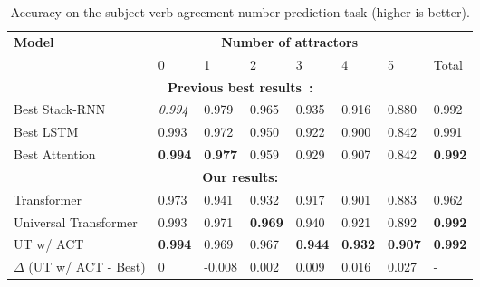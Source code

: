 \begin{table}
\centering
\begin{adjustbox}{max width=\textwidth}
\begin{tabular}{llllllll}
\toprule
\multirow{2}{*}{ \bf Model } & \multicolumn{6}{c}{ \bf Number of attractors } & \\ \cmidrule{2-7}
& 0 & 1 & 2 & 3 & 4 & 5 & Total \\ \midrule
\multicolumn{8}{c}{ \bf Previous best results~\citep{yogatama2018memory}: } \\ \midrule
Best Stack-RNN & \emph{0.994} & 0.979 & 0.965 & 0.935 & 0.916 & 0.880 & 0.992 \\
Best LSTM & 0.993 & 0.972 & 0.950 & 0.922 & 0.900 & 0.842 & 0.991 \\
Best Attention & \textbf{0.994} & \textbf{0.977} & 0.959 & 0.929 & 0.907 & 0.842 & \textbf{0.992} \\ \midrule
\multicolumn{8}{c}{ \bf Our results: } \\ \midrule
Transformer & 0.973 & 0.941 & 0.932 & 0.917 & 0.901 & 0.883 & 0.962 \\
Universal Transformer & 0.993 & 0.971 & \textbf{0.969} & 0.940 & 0.921 & 0.892 & \textbf{0.992} \\
UT w/ ACT & \textbf{0.994}	& 0.969	& 0.967	& \textbf{0.944}	& \textbf{0.932}	& \textbf{0.907}	& \textbf{0.992} \\
\midrule
$\Delta$ (UT w/ ACT - Best) & 0 & -0.008 & 0.002 & 0.009 & 0.016 & 0.027 & - \\
 \bottomrule
\end{tabular}
\end{adjustbox}
\caption{Accuracy on the subject-verb agreement number prediction task (higher is better).}
\label{tab:sva}
\end{table}